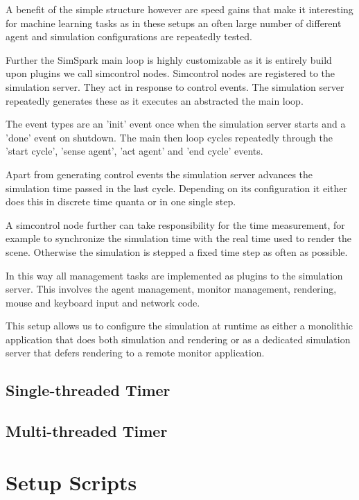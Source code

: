 A benefit of the simple structure however are speed gains that make it
interesting for machine learning tasks as in these setups an often
large number of different agent and simulation configurations are
repeatedly tested.

Further the SimSpark main loop is highly customizable as it is
entirely build upon plugins we call simcontrol nodes. Simcontrol nodes
are registered to the simulation server. They act in response to
control events. The simulation server repeatedly generates these as it
executes an abstracted the main loop.

The event types are an 'init' event once when the simulation server
starts and a 'done' event on shutdown. The main then loop cycles
repeatedly through the 'start cycle', 'sense agent', 'act agent' and
'end cycle' events.

Apart from generating control events the simulation server advances
the simulation time passed in the last cycle. Depending on its
configuration it either does this in discrete time quanta or in one
single step.

A simcontrol node further can take responsibility for the time
measurement, for example to synchronize the simulation time with the
real time used to render the scene.  Otherwise the simulation is
stepped a fixed time step as often as possible.

In this way all management tasks are implemented as plugins to the
simulation server. This involves the agent management, monitor
management, rendering, mouse and keyboard input and network code.

This setup allows us to configure the simulation at runtime as either
a monolithic application that does both simulation and rendering or as
a dedicated simulation server that defers rendering to a remote
monitor application.



\subsection{Single-threaded Timer}

\subsection{Multi-threaded Timer}

\section{Setup Scripts}




